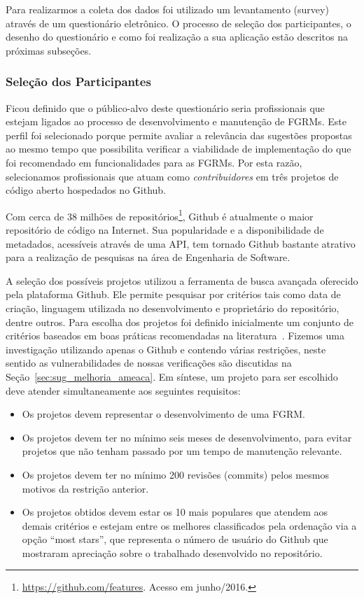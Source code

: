 Para realizarmos a coleta dos dados foi utilizado um levantamento (survey)
através de um questionário eletrônico. O processo de seleção dos participantes,
o desenho do questionário e como foi realização a sua aplicação estão descritos
na próximas subseções.

\subsubsection{Seleção dos Participantes}
\label{ssub:sug_melhoria_selecao_participantes}

Ficou definido que o público-alvo deste questionário seria profissionais que
estejam ligados ao processo de desenvolvimento e manutenção de FGRMs. Este
perfil foi selecionado porque permite avaliar a relevância das sugestões
propostas ao mesmo tempo que possibilita verificar a viabilidade de
implementação do que foi recomendado em funcionalidades para as FGRMs. Por esta
razão, selecionamos profissionais que atuam como \textit{contribuidores} em três
projetos de código aberto hospedados no Github.

Com cerca de 38 milhões de
repositórios\footnote{\url{https://github.com/features}. Acesso em junho/2016.},
Github é atualmente o maior repositório de código na Internet. Sua popularidade
e a disponibilidade de metadados, acessíveis através de uma API, tem tornado
Github bastante atrativo para a realização de pesquisas na área de Engenharia de
Software.

A seleção dos possíveis projetos utilizou a ferramenta de busca avançada
oferecido pela plataforma Github. Ele permite pesquisar por critérios tais como
data de criação, linguagem utilizada no desenvolvimento e proprietário do
repositório, dentre outros. Para escolha dos projetos foi definido inicialmente
um conjunto de critérios baseados em boas práticas recomendadas na
literatura~\cite{Bird2009}. Fizemos uma investigação utilizando apenas o Github
e contendo várias restrições, neste sentido as vulnerabilidades de nossas
verificações são discutidas na Seção~\ref{sec:sug_melhoria_ameaca}. Em síntese,
um projeto para ser escolhido deve atender simultaneamente aos seguintes
requisitos:

\begin{itemize}
	\item Os projetos devem representar o desenvolvimento de uma FGRM\@.
	\item Os projetos devem ter no mínimo seis meses de desenvolvimento, para
		evitar projetos que não tenham passado por um tempo de manutenção
		relevante.
	\item Os projetos devem  ter  no  mínimo  200  revisões (commits)  pelos
		mesmos motivos  da restrição anterior.
    \item Os projetos obtidos devem estar os 10 mais populares que atendem aos
        demais critérios e estejam entre os melhores classificados pela
        ordenação via a opção ``most stars'', que representa o número de
        usuário do Github que mostraram apreciação sobre o trabalhado
        desenvolvido no repositório.
\end{itemize}

